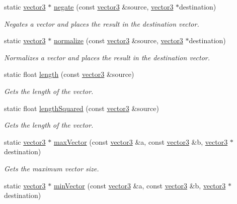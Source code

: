 \begin{DoxyCompactItemize}
static \hyperlink{classflounder_1_1vector3}{vector3} $\ast$ \hyperlink{classflounder_1_1vector3_ad37063e349d0e8d3c713a33e1f7fc9e5}{negate} (const \hyperlink{classflounder_1_1vector3}{vector3} \&source, \hyperlink{classflounder_1_1vector3}{vector3} $\ast$destination)
\begin{DoxyCompactList}\small\item\em Negates a vector and places the result in the destination vector. \end{DoxyCompactList}\item 
static \hyperlink{classflounder_1_1vector3}{vector3} $\ast$ \hyperlink{classflounder_1_1vector3_aedfa53c941fa5fe61d738c6d5c9fb47e}{normalize} (const \hyperlink{classflounder_1_1vector3}{vector3} \&source, \hyperlink{classflounder_1_1vector3}{vector3} $\ast$destination)
\begin{DoxyCompactList}\small\item\em Normalizes a vector and places the result in the destination vector. \end{DoxyCompactList}\item 
static float \hyperlink{classflounder_1_1vector3_a2264de66d0b62a4a996586a9638650da}{length} (const \hyperlink{classflounder_1_1vector3}{vector3} \&source)
\begin{DoxyCompactList}\small\item\em Gets the length of the vector. \end{DoxyCompactList}\item 
static float \hyperlink{classflounder_1_1vector3_aedbc786b7cfa2c647f6f0afb391b722a}{length\+Squared} (const \hyperlink{classflounder_1_1vector3}{vector3} \&source)
\begin{DoxyCompactList}\small\item\em Gets the length of the vector. \end{DoxyCompactList}\item 
static \hyperlink{classflounder_1_1vector3}{vector3} $\ast$ \hyperlink{classflounder_1_1vector3_a0230a6d65edfe89a165e51030dc6545b}{max\+Vector} (const \hyperlink{classflounder_1_1vector3}{vector3} \&a, const \hyperlink{classflounder_1_1vector3}{vector3} \&b, \hyperlink{classflounder_1_1vector3}{vector3} $\ast$destination)
\begin{DoxyCompactList}\small\item\em Gets the maximum vector size. \end{DoxyCompactList}\item 
static \hyperlink{classflounder_1_1vector3}{vector3} $\ast$ \hyperlink{classflounder_1_1vector3_a5dfa5ac4f31087913ec3ca63ead0cea1}{min\+Vector} (const \hyperlink{classflounder_1_1vector3}{vector3} \&a, const \hyperlink{classflounder_1_1vector3}{vector3} \&b, \hyperlink{classflounder_1_1vector3}{vector3} $\ast$destination)

\end{DoxyCompactItemize}
